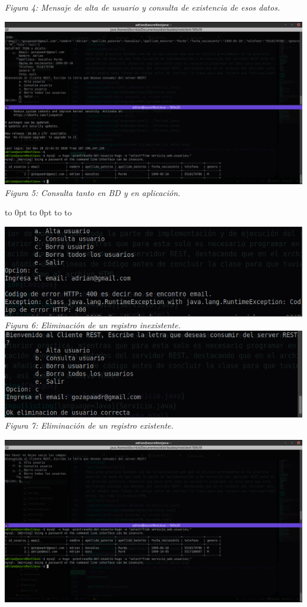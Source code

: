 \documentclass[10pt,executivepaper]{article}
\def\fillandplacepagenumber{%
 \par\pagestyle{empty}%
 \vbox to 0pt{\vss}\vfill
 \vbox to 0pt{\baselineskip0pt
   \hbox to\linewidth{\hss}%
   \baselineskip\footskip
   \hbox to\linewidth{%
     \hfil\thepage\hfil}\vss}}
\begin{document}
\begin{center}
  \textit{Figura 4: Mensaje de alta de usuario y consulta de existencia de esos datos.}
  \begin{landscape}
    \includegraphics[scale=0.45]{imgs/consulta.png}\\
    \textit{Figura 5: Consulta tanto en BD y en aplicación.}
    \fillandplacepagenumber
  \end{landscape}
  \includegraphics[scale=0.5]{imgs/del-not.png}\\
  \textit{Figura 6: Eliminación de un registro inexistente.}\\
  \includegraphics[scale=0.5]{imgs/del-correcta.png}\\
  \textit{Figura 7: Eliminación de un registro existente.}\\
  \begin{landscape}
    \includegraphics[scale=0.45]{imgs/del_all.png}\\

\end{landscape}
\end{center}
\end{document}
